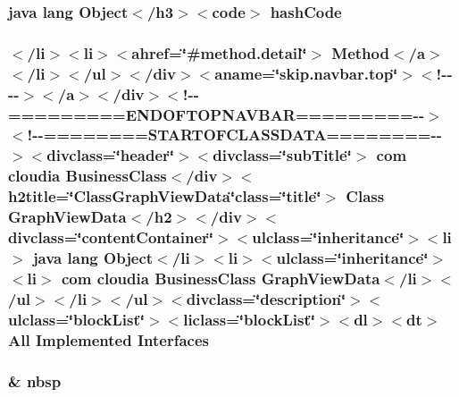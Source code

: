 \hypertarget{_graph_view_data_8html_a8e178e2bb2bef055ea23ea3910a221ca}{
\subsubsection[{hash\-Code}]{\setlength{\rightskip}{0pt plus 5cm}java lang Object$<$/h3$>$$<$code$>$ hash\-Code}}\label{_graph_view_data_8html_a8e178e2bb2bef055ea23ea3910a221ca}
\hypertarget{_graph_view_data_8html_a2e0f64ed775591d8dbd35601b0ffa02f}{
\subsubsection[{Interfaces}]{\setlength{\rightskip}{0pt plus 5cm}$<$/li$>$$<$li$>$$<$ahref=\char`\"{}\#method.\-detail\char`\"{}$>$ Method$<$/{\bf a}$>$$<$/li$>$$<$/ul$>$$<$/div$>$$<$aname=\char`\"{}skip.\-navbar.\-top\char`\"{}$>$$<$!-\/-\/-\/-\/$>$$<$/a$>$$<$/div$>$$<$!-\/-\/=========E\-N\-D\-O\-F\-T\-O\-P\-N\-A\-V\-B\-A\-R=========-\/-\/$>$$<$!-\/-\/========S\-T\-A\-R\-T\-O\-F\-C\-L\-A\-S\-S\-D\-A\-T\-A========-\/-\/$>$$<$divclass=\char`\"{}header\char`\"{}$>$$<$divclass=\char`\"{}sub\-Title\char`\"{}$>$ com cloudia Business\-Class$<$/div$>$$<$h2title=\char`\"{}Class\-Graph\-View\-Data\char`\"{}class=\char`\"{}title\char`\"{}$>$ Class {\bf Graph\-View\-Data}$<$/h2$>$$<$/div$>$$<$divclass=\char`\"{}content\-Container\char`\"{}$>$$<$ulclass=\char`\"{}inheritance\char`\"{}$>$$<$li$>$ java lang Object$<$/li$>$$<$li$>$$<$ulclass=\char`\"{}inheritance\char`\"{}$>$$<$li$>$ com cloudia Business\-Class {\bf Graph\-View\-Data}$<$/li$>$$<$/ul$>$$<$/li$>$$<$/ul$>$$<$divclass=\char`\"{}description\char`\"{}$>$$<$ulclass=\char`\"{}block\-List\char`\"{}$>$$<$liclass=\char`\"{}block\-List\char`\"{}$>$$<$dl$>$$<${\bf dt}$>$ All Implemented Interfaces}}\label{_graph_view_data_8html_a2e0f64ed775591d8dbd35601b0ffa02f}
\hypertarget{_graph_view_data_8html_aef915316f784c9063d942974538301a6}{
\subsubsection[{nbsp}]{\setlength{\rightskip}{0pt plus 5cm}\& nbsp}}\label{_graph_view_data_8html_aef915316f784c9063d942974538301a6}
